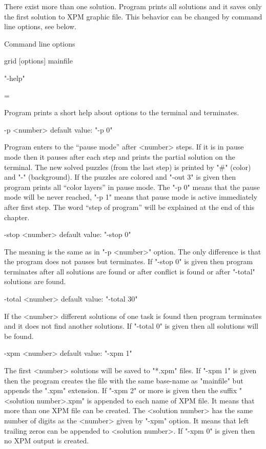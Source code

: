 \bod There exist more than one solution.
  Program prints all solutions and it saves only the first solution to
  XPM graphic file. This behavior can be changed by command line
  options, see below.


\tit Command line options

\begtt
grid [options] mainfile
\endtt

\noindent "-help"

\bgroup \leftskip=\parindent \parindent=0pt
\def\bod{\par}

   Program prints a short help about options to the terminal and 
   terminates.

\para -p <number>                default value: "-p 0"

   Program enters to the ``pause mode'' after <number> steps.
   If it is in pause mode then it pauses after each step
   and prints the partial solution on the terminal. The new
   solved puzzles (from the last step) is printed by "#" (color)
   and "-" (background). If the puzzles are colored and "-out 3" 
   is given then program prints all ``color layers'' in pause mode.
   The "-p 0" means that the pause mode will be never reached,
   "-p 1" means that pause mode is active immediately after first step.
   The word ``step of program'' will be explained at the end
   of this chapter.

\para -stop <number>             default value: "-stop 0"

   The meaning is the same as in "-p <number>" option. The only
   difference is that the program does not pauses but terminates.
   If "-stop 0" is given then program terminates after all solutions
   are found or after conflict is found or after "-total" solutions
   are found.

\para -total <number>            default value: "-total 30"

   If the <number> different solutions of one task is found then
   program terminates and it does not find another solutions.
   If "-total 0" is given then all solutions will be found.

\para -xpm <number>              default value: "-xpm 1"

   The first <number> solutions will be saved to "*.xpm" files.
   If "-xpm 1" is given then the program creates the file with the
   same base-name as "mainfile" but appends the ".xpm" extension.
   If "-xpm 2" or more is given then the suffix "<solution number>.xpm"
   is appended to each name of XPM file. It means that more than one
   XPM file can be created. The <solution number> has the same
   number of digits as the <number> given by "-xpm" option. It means
   that left trailing zeros can be appended to <solution number>.
   If "-xpm 0" is given then no XPM output is created.

